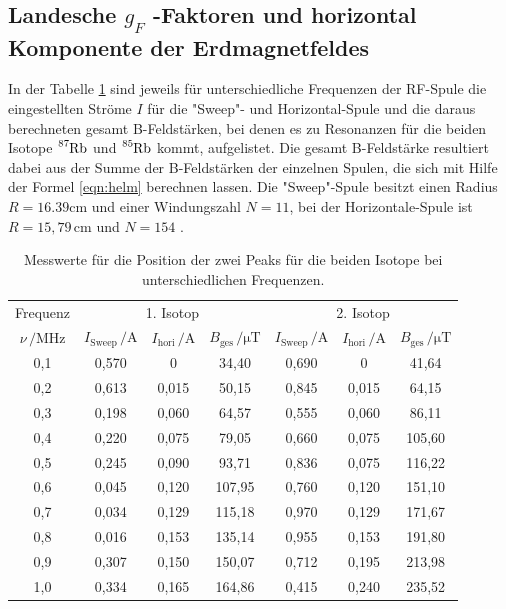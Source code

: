 \subsection{Landesche $g_F$ -Faktoren und horizontal Komponente der Erdmagnetfeldes}
In der Tabelle \ref{tab:messwerte} sind jeweils
für  unterschiedliche Frequenzen der RF-Spule
die eingestellten Ströme $I$ für die "Sweep"- und Horizontal-Spule
und die daraus
berechneten gesamt B-Feldstärken,
bei denen es zu Resonanzen für die beiden Isotope $\ce{^{87}Rb}$ und $\ce{^{85}Rb}$
 kommt, aufgelistet.
Die gesamt  B-Feldstärke resultiert dabei aus
der Summe der B-Feldstärken der
einzelnen Spulen, die sich mit Hilfe der Formel \eqref{eqn:helm}
berechnen lassen.
Die "Sweep"-Spule besitzt einen Radius  $R=16.39\si{\centi\meter}$
und einer Windungszahl $N=11$, bei der Horizontale-Spule ist $R=15,79\,\si{\centi\meter}$
 und $N=154$ .
\FloatBarrier
\begin{table}
\centering
\caption{Messwerte für die Position der zwei Peaks für die beiden Isotope bei unterschiedlichen Frequenzen.}
\label{tab:messwerte}
\begin{tabular}{c| c c c | c c c }
\toprule
Frequenz & \multicolumn{3}{c}{1. Isotop} & \multicolumn{3}{c}{2. Isotop} \\
$\nu \,/ \si{\mega\hertz}$  & $I_\mathrm{Sweep} \,/ \si{\ampere}$ &   $I_\mathrm{hori} \, /\si{\ampere}$ &  $B_\mathrm{ges} \, / \si{\micro\tesla}$ & $I_\mathrm{Sweep} \,/ \si{\ampere}$
&   $I_\mathrm{hori} \, /\si{\ampere} $ & $ B_\mathrm{ges} \, /\si{\micro\tesla}$\\
\midrule
0,1 & 0,570 &  0       & 34,40  & 0,690 & 0      &   41,64 \\
0,2 & 0,613 &  0,015   & 50,15  & 0,845 & 0,015  &   64,15 \\
0,3 & 0,198 &  0,060   & 64,57  & 0,555 & 0,060  &   86,11 \\
0,4 & 0,220 &  0,075   & 79,05  & 0,660 & 0,075  &  105,60 \\
0,5 & 0,245 &  0,090   & 93,71  & 0,836 & 0,075  &  116,22 \\
0,6 & 0,045 &  0,120   & 107,95 & 0,760 & 0,120  &  151,10 \\
0,7 & 0,034 &  0,129   & 115,18 & 0,970 & 0,129  &  171,67 \\
0,8 & 0,016 &  0,153   & 135,14 & 0,955 & 0,153  &  191,80 \\
0,9 & 0,307 &  0,150   & 150,07 & 0,712 & 0,195  &  213,98 \\
1,0 & 0,334 &  0,165   & 164,86 & 0,415 & 0,240  &  235,52 \\
\bottomrule
\end{tabular}
\end{table}

